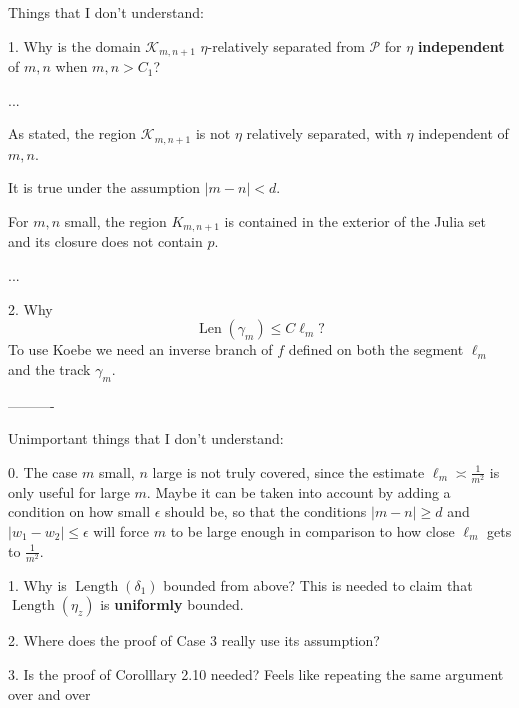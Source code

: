 Things that I don't understand:

1. Why is the domain $\mathcal K_{m,n+1}$ $\eta$-relatively separated from $\mathcal P$ for $\eta$ \textbf{independent} of $m,n$ when $m,n>C_1$?

...

As stated, the region  $\mathcal K_{m,n+1}$ is not $\eta$ relatively separated, with $\eta$ independent of $m, n$. 

It is true under the assumption $|m-n| < d$.

For $m, n$ small, the region $K_{m,n+1}$ is contained in the exterior of the Julia set and its closure does not contain $p$.

...

2. Why $$\operatorname{Len}(\gamma_m) \leq C \ell_m?$$
To use Koebe we need an inverse branch of $f$ defined on both the segment $\ell_m$ and the track $\gamma_m$.

----------

Unimportant things that I don't understand:

0. The case $m$ small, $n$ large is not truly covered, since the estimate $\ell_m \asymp \frac 1{m^2}$ is only useful for large $m$. 
Maybe it can be taken into account by adding a condition on how small $\epsilon$ should be, so that the conditions $|m-n| \geq d$ and $|w_1-w_2| \leq \epsilon$ will force $m$ to be large enough in comparison to how close $\ell _m$ gets to $\frac 1{m^2}$.

1. Why is $\operatorname{Length}(\delta_1)$ bounded from above? This is needed to claim that $\operatorname{Length}(\eta_z)$ is \textbf{uniformly} bounded.

2. Where does the proof of Case 3 really use its assumption?

3. Is the proof of Corolllary 2.10 needed? Feels like repeating the same argument over and over




